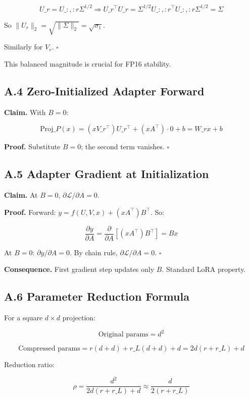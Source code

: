 \[
U\_r = U\_{:, :r} \Sigma^{1/2} \Rightarrow U\_r^\top U\_r = \Sigma^{1/2} U\_{:, :r}^\top U\_{:, :r} \Sigma^{1/2} = \Sigma
\tag{A.4}
\]

So $\|U_r\|_2 = \sqrt{\|\Sigma\|_2} = \sqrt{\sigma_1}$.

Similarly for $V_r$. $\square$

This balanced magnitude is crucial for FP16 stability.

\subsection{A.4 Zero-Initialized Adapter Forward}

\textbf{Claim.} With $B = 0$:

\[
\text{Proj}\_P(x) = (x V\_r^\top) U\_r^\top + (x A^\top) \cdot 0 + b = W\_r x + b
\tag{A.5}
\]

\textbf{Proof.} Substitute $B = 0$; the second term vanishes. $\square$

\subsection{A.5 Adapter Gradient at Initialization}

\textbf{Claim.} At $B = 0$, $\partial \mathcal{L} / \partial A = 0$.

\textbf{Proof.} Forward: $y = f(U, V, x) + (x A^\top) B^\top$. So:

\[
\frac{\partial y}{\partial A} = \frac{\partial}{\partial A} \left[ (x A^\top) B^\top \right] = B x
\tag{A.6}
\]

At $B = 0$: $\partial y / \partial A = 0$. By chain rule, $\partial \mathcal{L} / \partial A = 0$. $\square$

\textbf{Consequence.} First gradient step updates only $B$. Standard LoRA property.

\subsection{A.6 Parameter Reduction Formula}

For a square $d \times d$ projection:

\[
\text{Original params} = d^2
\tag{A.7}
\]

\[
\text{Compressed params} = r(d + d) + r\_L(d + d) + d = 2d(r + r\_L) + d
\tag{A.7}
\]

Reduction ratio:

\[
\rho = \frac{d^2}{2d(r + r\_L) + d} \approx \frac{d}{2(r + r\_L)}
\tag{A.8}
\]

